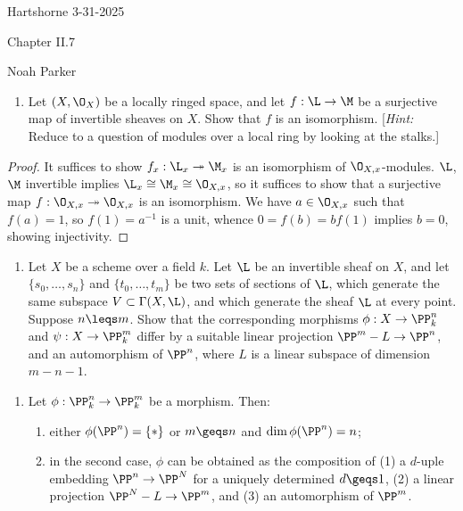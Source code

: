 \documentclass[12pt]{amsart}
\begin{document}
{Hartshorne} \hfill {3-31-2025}

\bigskip\bigskip

\begin{center}

{\sc Chapter II.7}

\end{center}

\begin{center}

  {Noah Parker} 
    
\end{center}

\bigskip\bigskip

\begin{enumerate}
  \item[7.1.] {
      Let $(X,\O_X)$ be a locally ringed space, and let $f:\L\to \M$ be a surjective map of invertible sheaves on $X$.
      Show that $f$ is an isomorphism.
      [\emph{Hint:} Reduce to a question of modules over a local ring by looking at the stalks.]
    }
\end{enumerate}

\begin{proof}
  It suffices to show $f_x:\L_x\twoheadrightarrow \M_x$ is an isomorphism of $\O_{X,x}$-modules.
  $\L$, $\M$ invertible implies $\L_x\cong \M_x\cong \O_{X,x}$, so it suffices to show that a surjective map $f:\O_{X,x}\twoheadrightarrow\O_{X,x}$ is an isomorphism.
  We have $a\in \O_{X,x}$ such that $f(a) = 1$, so $f(1)=a^{-1}$ is a unit, whence $0=f(b)=bf(1)$ implies $b=0$, showing injectivity.
\end{proof}

\begin{enumerate}
  \item[7.2.] {
      Let $X$ be a scheme over a field $k$.
      Let $\L$ be an invertible sheaf on $X$, and let $\{s_0,\ldots,s_n\}$ and $\{t_0,\ldots,t_m\}$ be two sets of sections of $\L$, which generate the same subspace $V\subset \Gamma(X,\L)$, and which generate the sheaf $\L$ at every point.
      Suppose $n\leqs m$.
      Show that the corresponding morphisms $\phi:X\to \PP^n_k$ and $\psi:X\to \PP^m_k$ differ by a suitable linear projection $\PP^m-L\to \PP^n$, and an automorphism of $\PP^n$, where $L$ is a linear subspace of dimension $m-n-1$.
    }
\end{enumerate}

\begin{enumerate}
  \item[7.3.] {
      Let $\phi:\PP^n_k\to \PP^m_k$ be a morphism.
      Then:
      \begin{enumerate}
        \item either $\phi(\PP^n)=\{*\}$ or $m\geqs n$ and $\dim \phi(\PP^n)=n$;
        \item in the second case, $\phi$ can be obtained as the composition of (1) a $d$-uple embedding $\PP^n\to \PP^N$ for a uniquely determined $d\geqs 1$, (2) a linear projection $\PP^N-L\to \PP^m$, and (3) an automorphism of $\PP^m$.
      \end{enumerate}
    }
\end{enumerate}
\end{document}
